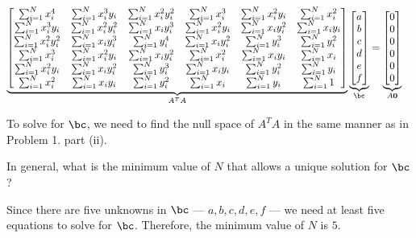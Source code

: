 \begin{problem}
\begin{enumalph}
\begin{answer}
        \begin{align*}
          \underbrace{\begin{bmatrix}
            \sum_{i=1}^N x_i^4 & \sum_{i=1}^N x_i^3y_i & \sum_{i=1}^N x_i^2y_i^2 & \sum_{i=1}^N x_i^3 & \sum_{i=1}^N x_i^2y_i & \sum_{i=1}^N x_i^2 \\
            \sum_{i=1}^N x_i^3y_i & \sum_{i=1}^N x_i^2y_i^2 & \sum_{i=1}^N x_iy_i^3 & \sum_{i=1}^N x_i^2y_i & \sum_{i=1}^N x_iy_i^2 & \sum_{i=1}^N x_iy_i \\
            \sum_{i=1}^N x_i^2y_i^2 & \sum_{i=1}^N x_iy_i^3 & \sum_{i=1}^N y_i^4 & \sum_{i=1}^N x_iy_i^2 & \sum_{i=1}^N y_i^3 & \sum_{i=1}^N y_i^2 \\
            \sum_{i=1}^N x_i^3 & \sum_{i=1}^N x_i^2y_i & \sum_{i=1}^N x_iy_i^2 & \sum_{i=1}^N x_i^2 & \sum_{i=1}^N x_iy_i & \sum_{i=1}^N x_i \\
            \sum_{i=1}^N x_i^2y_i & \sum_{i=1}^N x_iy_i^2 & \sum_{i=1}^N y_i^3 & \sum_{i=1}^N x_iy_i & \sum_{i=1}^N y_i^2 & \sum_{i=1}^N y_i \\
            \sum_{i=1}^N x_i^2 & \sum_{i=1}^N x_iy_i & \sum_{i=1}^N y_i^2 & \sum_{i=1}^N x_i & \sum_{i=1}^N y_i & \sum_{i=1}^N 1 \\
          \end{bmatrix}}_{A^TA}
          \underbrace{\begin{bmatrix}
            a \\
            b \\
            c \\
            d \\
            e \\
            f \\
          \end{bmatrix}}_{\bc}
          &=
          \underbrace{\begin{bmatrix}
            0 \\
            0 \\
            0 \\
            0 \\
            0 \\
            0 \\
          \end{bmatrix}}_{A \mathbf{0}}
        \end{align*}
        
        To solve for $\bc$, we need to find the null space of $A^TA$
        in the same manner as in Problem 1. part (ii).
      \end{answer}
    \item In general, what is the minimum value of $N$ that
      allows a unique solution for $\bc$?
      \begin{answer}
        Since there are five unknowns in $\bc$ ---
        $a, b, c, d, e, f$ --- we need at least five equations
        to solve for $\bc$.
        Therefore, the minimum value of $N$ is $5$.
      \end{answer}


\end{enumalph}
\end{problem}
